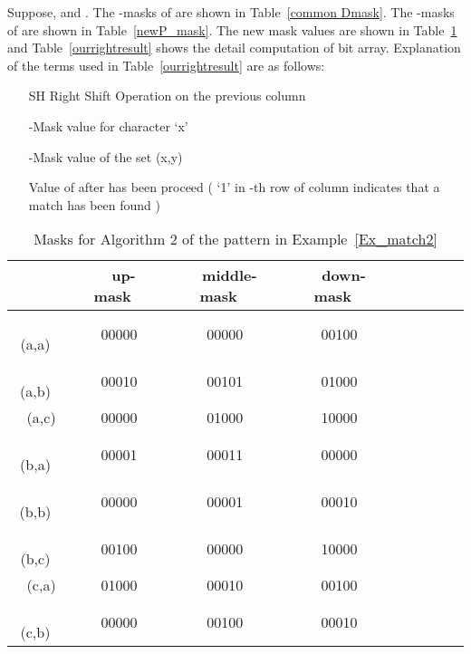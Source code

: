 \documentclass{llncs}
\begin{document}
{\begin{example}\label{Ex_match2}
Suppose,  and . The -masks of  are shown in Table~\ref{common Dmask}. The -masks of  are shown in Table~\ref{newP_mask}. The new mask values are shown in Table~\ref{ournewmask} and Table~\ref{ourrightresult} shows the detail computation of  bit array. Explanation of the terms used in Table~\ref{ourrightresult} are as follows:   

\begin{itemize}
\item[SH] Right Shift Operation on the previous column
\item[] -Mask value for character `x'
\item[] -Mask value of the set (x,y)
\item[] Value of  after  has been proceed ( `1' in -th row of  column indicates that a match has been found )
\end{itemize}
\end{example}





\begin{table}
\begin{center}
\begin{tabular}{|c|c|c|c|c|c|c|c|c|}
\hline
~  ~&~ up-mask~ &~ middle-mask~ &~ down-mask~ \\
\hline
~ (a,a)~ &~ 00000~ &~ 00000~ &~ 00100~ \\
\hline
~ (a,b)~ &~ 00010~ &~ 00101~ &~ 01000~ \\
\hline
~ (a,c)~ &~ 00000~ &~ 01000~ &~ 10000~ \\
\hline
~ (b,a)~ &~ 00001~ &~ 00011~ &~ 00000~ \\
\hline 
~ (b,b)~ &~ 00000~ &~ 00001~ &~ 00010~ \\
\hline
~ (b,c)~ &~ 00100~ &~ 00000~ &~ 10000~ \\
\hline
~ (c,a)~ &~ 01000~ &~ 00010~ &~ 00100~ \\
\hline
~ (c,b)~ &~ 00000~ &~ 00100~ &~ 00010~ \\
\hline
\end{tabular}
\caption{Masks for Algorithm 2 of the pattern in Example~\ref{Ex_match2}} \label{ournewmask}
\end{center}
\end{table}





}
\end{document}
